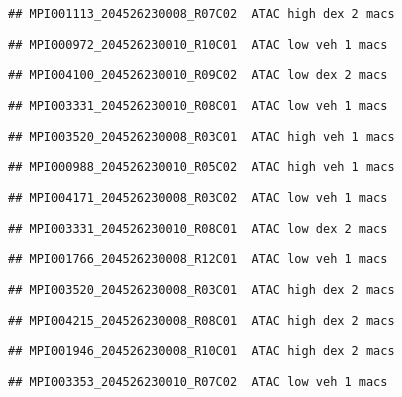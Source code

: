 \documentclass[
]{article}
\begin{document}
\begin{verbatim}
## MPI001113_204526230008_R07C02  ATAC high dex 2 macs
\end{verbatim}

\begin{verbatim}
## MPI000972_204526230010_R10C01  ATAC low veh 1 macs
\end{verbatim}

\begin{verbatim}
## MPI004100_204526230010_R09C02  ATAC low dex 2 macs
\end{verbatim}

\begin{verbatim}
## MPI003331_204526230010_R08C01  ATAC low veh 1 macs
\end{verbatim}

\begin{verbatim}
## MPI003520_204526230008_R03C01  ATAC high veh 1 macs
\end{verbatim}

\begin{verbatim}
## MPI000988_204526230010_R05C02  ATAC high veh 1 macs
\end{verbatim}

\begin{verbatim}
## MPI004171_204526230008_R03C02  ATAC low veh 1 macs
\end{verbatim}

\begin{verbatim}
## MPI003331_204526230010_R08C01  ATAC low dex 2 macs
\end{verbatim}

\begin{verbatim}
## MPI001766_204526230008_R12C01  ATAC low veh 1 macs
\end{verbatim}

\begin{verbatim}
## MPI003520_204526230008_R03C01  ATAC high dex 2 macs
\end{verbatim}

\begin{verbatim}
## MPI004215_204526230008_R08C01  ATAC high dex 2 macs
\end{verbatim}

\begin{verbatim}
## MPI001946_204526230008_R10C01  ATAC high dex 2 macs
\end{verbatim}

\begin{verbatim}
## MPI003353_204526230010_R07C02  ATAC low veh 1 macs
\end{verbatim}
\end{document}
